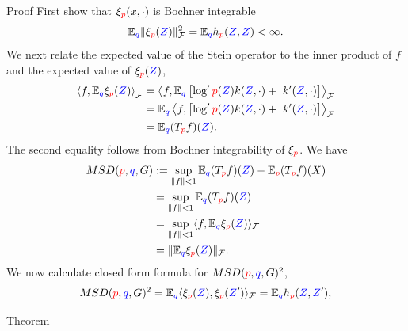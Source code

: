 \begin{frame}
\begin{columns}
\begin{column}{.33\linewidth}
\begin{block}{Proof}
First show that $\xi_{{ \color{red} p}}(x,\cdot)$ is Bochner integrable
\[
\mathbb{E}_{{ \color{blue} q}}\|\xi_{{ \color{red} p}}({ \color{blue} Z})\|_{\mathcal{\mathcal{F}}}^{2}=\mathbb{E}_{{ \color{blue} q}}h_{{ \color{red} p}}({ \color{blue} Z},{ \color{blue} Z})<\infty.
\]
We next relate the expected value of the Stein operator to the inner product of $f$ and the expected value
of $\xi_{{ \color{red} p}}({ \color{blue} Z})$,  
\begin{align*}
  \left\langle f,\mathbb{E}_{{ \color{blue} q}} \xi_{{ \color{red} p}}({ \color{blue} Z}) \right\rangle _{\mathcal{\mathcal{F}}}& =\left\langle f,\mathbb{E}_{{ \color{blue} q}} \left[  \log' { \color{red} p}({ \color{blue} Z}) k({ \color{blue} Z},\cdot)+\ k'({ \color{blue} Z},\cdot) \right] \right \rangle _{\mathcal{\mathcal{F}}}\\
 & = \mathbb{E}_{{ \color{blue} q}}  \left\langle f,\left[  \log' { \color{red} p}({ \color{blue} Z}) k({ \color{blue} Z},\cdot)+\ k'({ \color{blue} Z},\cdot) \right] \right \rangle _{\mathcal{\mathcal{F}}}\\
 & =\mathbb{E}_{{ \color{blue} q}}(T_{{ \color{red} p}}f)({ \color{blue} Z}).
\end{align*}
The second equality follows from  Bochner integrability of $\xi_{{ \color{red} p}}$.
We have 
\begin{align*}
MSD({ \color{red} p},{ \color{blue} q},G) & :=\sup_{\Vert f\Vert<1}\mathbb{E}_{{ \color{blue} q}}(T_{{ \color{red} p}}f)({ \color{blue} Z})-\mathbb{E}_{{ \color{red} p}}(T_{{ \color{red} p}}f)(X)\\
 & =\sup_{\Vert f\Vert<1}\mathbb{E}_{{ \color{blue} q}}(T_{{ \color{red} p}}f)({ \color{blue} Z})\\
 & =\sup_{\Vert f\Vert<1}\langle f,\mathbb{E}_{{ \color{blue} q}}\xi_{{ \color{red} p}}({ \color{blue} Z})\rangle_{{\cal \mathcal{F}}}\\
 & =\|\mathbb{E}_{{ \color{blue} q}}\xi_{{ \color{red} p}}({ \color{blue} Z})\|_{\mathcal{\mathcal{F}}}.
\end{align*}
We now calculate closed form formula for $MSD({ \color{red} p},{ \color{blue} q},G)^{2}$,
\begin{align*}
MSD({ \color{red} p},{ \color{blue} q},G)^{2}  =\mathbb{E}_{{ \color{blue} q}}\langle\xi_{{ \color{red} p}}({ \color{blue} Z}),\xi_{{ \color{red} p}}({ \color{blue} Z}')\rangle_{\mathcal{\mathcal{F}}}=\mathbb{E}_{{ \color{blue} q}}h_{{ \color{red} p}}({ \color{blue} Z},{ \color{blue} Z}'),
\end{align*}
\end{block}


\vspace{-0.75cm}
\begin{block}{Theorem}
\vspace{1cm}



\end{block}
\end{column}
\end{columns}
\end{frame}
